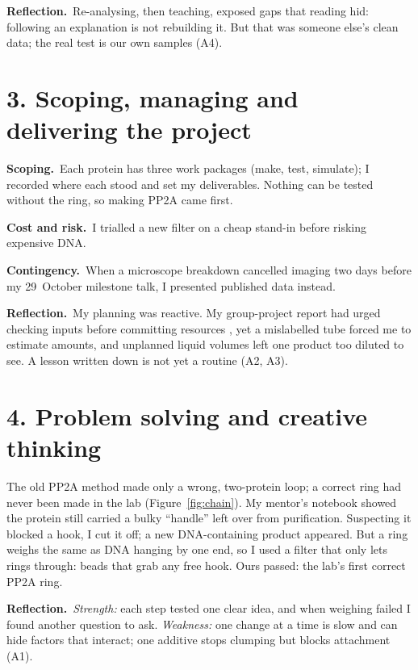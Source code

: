 \documentclass[a4paper,11pt]{article}
\newcommand{\lbl}[1]{\textbf{#1}\ }
\begin{document}
\lbl{Reflection.}Re-analysing, then teaching, exposed gaps that reading hid: following an explanation is not rebuilding it. But that was someone else's clean data; the real test is our own samples (A4).

\section*{3. Scoping, managing and delivering the project}
\lbl{Scoping.}Each protein has three work packages (make, test, simulate); I recorded where each stood and set my deliverables. Nothing can be tested without the ring, so making PP2A came first.

\lbl{Cost and risk.}I trialled a new filter on a cheap stand-in before risking expensive DNA.

\lbl{Contingency.}When a microscope breakdown cancelled imaging two days before my 29~October milestone talk, I presented published data instead.

\lbl{Reflection.}My planning was reactive. My group-project report had urged checking inputs before committing resources \parencite{kumar2026}, yet a mislabelled tube forced me to estimate amounts, and unplanned liquid volumes left one product too diluted to see. A lesson written down is not yet a routine (A2, A3).

\section*{4. Problem solving and creative thinking}
The old PP2A method made only a wrong, two-protein loop; a correct ring had never been made in the lab (Figure~\ref{fig:chain}). My mentor's notebook showed the protein still carried a bulky ``handle'' left over from purification. Suspecting it blocked a hook, I cut it off; a new DNA-containing product appeared. But a ring weighs the same as DNA hanging by one end, so I used a filter that only lets rings through: beads that grab any free hook. Ours passed: the lab's first correct PP2A ring.

\lbl{Reflection.}\textit{Strength:} each step tested one clear idea, and when weighing failed I found another question to ask. \textit{Weakness:} one change at a time is slow and can hide factors that interact; one additive stops clumping but blocks attachment (A1).
\end{document}
